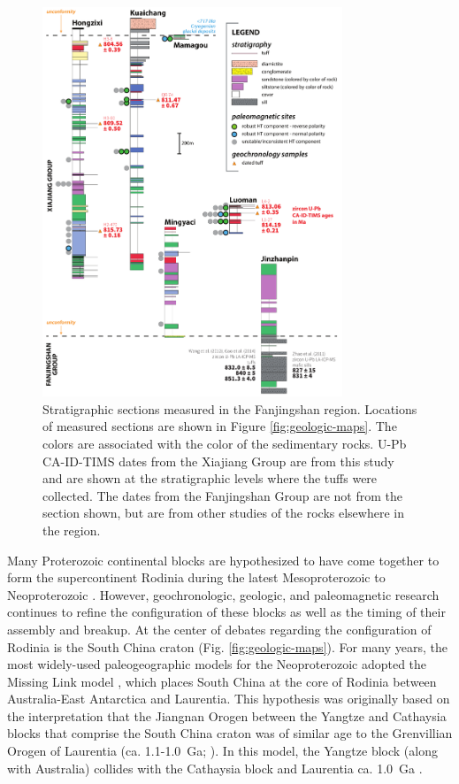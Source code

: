 \begin{figure}[h!]
    \centering
    \includegraphics[width=0.80\textwidth]{figures/Xiajiang/stratigraphic-sections.pdf}
    \caption[Stratigraphic sections measured in the Fanjingshan region.]{Stratigraphic sections measured in the Fanjingshan region. Locations of measured sections are shown in Figure \ref{fig:geologic-maps}. The colors are associated with the color of the sedimentary rocks. U-Pb CA-ID-TIMS dates from the Xiajiang Group are from this study and are shown at the stratigraphic levels where the tuffs were collected. The dates from the Fanjingshan Group are not from the section shown, but are from other studies of the rocks elsewhere in the region.}
    \label{fig:stratigraphic-sections}
\end{figure}

Many Proterozoic continental blocks are hypothesized to have come together to form the supercontinent Rodinia during the latest Mesoproterozoic to Neoproterozoic \citep{Hoffman1991a, Li2008a}. However, geochronologic, geologic, and paleomagnetic research continues to refine the configuration of these blocks as well as the timing of their assembly and breakup. At the center of debates regarding the configuration of Rodinia is the South China craton (Fig. \ref{fig:geologic-maps}). For many years, the most widely-used paleogeographic models for the Neoproterozoic adopted the Missing Link model \citep{Li1995a, Li2008a}, which places South China at the core of Rodinia between Australia-East Antarctica and Laurentia. This hypothesis was originally based on the interpretation that the Jiangnan Orogen between the Yangtze and Cathaysia blocks that comprise the South China craton was of similar age to the Grenvillian Orogen of Laurentia (ca. 1.1-1.0~Ga; \citealp{Li1995a}). In this model, the Yangtze block (along with Australia) collides with the Cathaysia block and Laurentia ca. 1.0~Ga \citep{Li1995a}.

